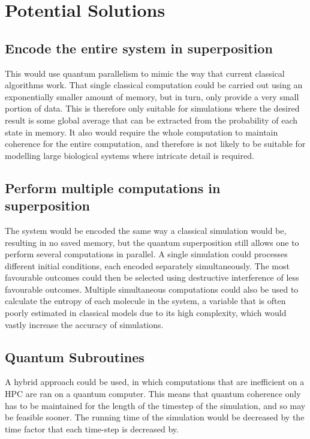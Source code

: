 {}
\section*{Potential Solutions}

{}
\subsection*{Encode the entire system in superposition}
This would use quantum parallelism to mimic the way that current classical algorithms work. That single classical computation could be carried out using an exponentially smaller amount of memory, but in turn, only provide a very small portion of data. This is therefore only suitable for simulations where the desired result is some global average that can be extracted from the probability of each state in memory. It also would require the whole computation to maintain coherence for the entire computation, and therefore is not likely to be suitable for modelling large biological systems where intricate detail is required.

{}
\subsection*{Perform multiple computations in superposition}
The system would be encoded the same way a classical simulation would be, resulting in no saved memory, but the quantum superposition still allows one to perform several computations in parallel. A single simulation could processes different initial conditions, each encoded separately simultaneously. The most favourable outcomes could then be selected using destructive interference of less favourable outcomes. 
Multiple simultaneous computations could also be used to calculate the entropy of each molecule in the system, a variable that is often poorly estimated in classical models due to its high complexity, which would vastly increase the accuracy of simulations.

{}
\subsection*{Quantum Subroutines}
A hybrid approach could be used, in which computations that are inefficient on a HPC are ran on a quantum computer. This means that quantum coherence only has to be maintained for the length of the timestep of the simulation, and so may be feasible sooner. The running time of the simulation would be decreased by the time factor that each time-step is decreased by.   